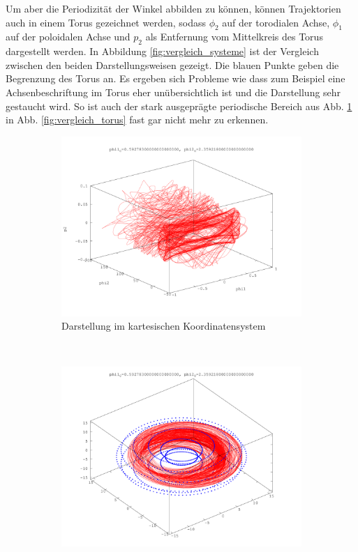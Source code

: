 Um aber die Periodizität der Winkel abbilden zu können, können Trajektorien auch in einem Torus gezeichnet werden, sodass $\phi_2$ auf der torodialen Achse, $\phi_1$ auf der poloidalen Achse und $p_2$ als Entfernung vom Mittelkreis des Torus dargestellt werden.
In Abbildung \ref{fig:vergleich_systeme} ist der Vergleich zwischen den beiden Darstellungsweisen gezeigt.
Die blauen Punkte geben die Begrenzung des Torus an.
Es ergeben sich Probleme wie dass zum Beispiel eine Achsenbeschriftung im Torus eher unübersichtlich ist und die Darstellung sehr gestaucht wird.
So ist auch der stark ausgeprägte periodische Bereich aus Abb. \ref{fig:vergleich_kartesisch} in Abb. \ref{fig:vergleich_torus} fast gar nicht mehr zu erkennen.

\begin{figure}
        \centering
        \begin{subfigure}[b]{0.49\textwidth}
                \centering
                \includegraphics[width=\textwidth]{images/phasenraeume/c_diagonal_31.png}
                \caption{Darstellung im kartesischen Koordinatensystem}
                \label{fig:vergleich_kartesisch}
        \end{subfigure}
        ~
        \begin{subfigure}[b]{0.49\textwidth}
                \centering
                \includegraphics[width=\textwidth]{images/phasenraeume/c_diagonal_31_torus.png}

\end{subfigure}
\end{figure}
